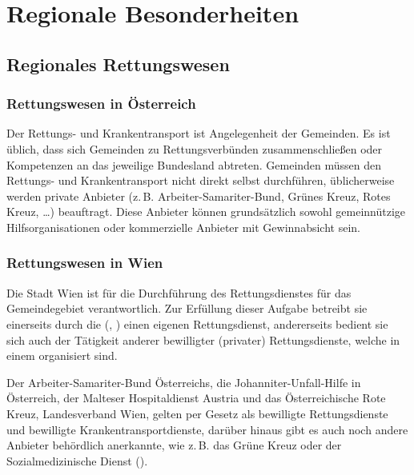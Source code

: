 \def\ChapterCode{REG}
\chapter
[\CO{[REG]} Regionale Besonderheiten]
{Regionale Besonderheiten}
\label{chp:REG}


\section{Regionales Rettungswesen}
\label{topic:regionales-rettungswesen}


\subsection{Rettungswesen in Österreich}

Der Rettungs- und Krankentransport ist Angelegenheit der
Gemeinden. Es ist üblich, dass sich Gemeinden zu
Rettungsverbünden zusammenschließen oder Kompetenzen an das
jeweilige Bundesland abtreten.  Gemeinden müssen den
Rettungs- und Krankentransport nicht direkt selbst
durchführen, üblicherweise werden private Anbieter (z.\,B.
Arbeiter-Samariter-Bund, Grünes Kreuz, Rotes Kreuz, \ldots{})
beauftragt. Diese Anbieter können grundsätzlich sowohl
gemeinnützige Hilfsorganisationen oder kommerzielle Anbieter
mit Gewinnabsicht sein.


\subsection{Rettungswesen in Wien}
\label{topic:rettungswesen-wien}

Die Stadt Wien ist für die Durchführung des Rettungsdienstes
für das Gemeindegebiet verantwortlich. Zur Erfüllung dieser
Aufgabe betreibt sie einerseits durch die
 (, ) einen eigenen Rettungsdienst, andererseits
bedient sie sich auch der Tätigkeit anderer bewilligter
(privater) Rettungsdienste, welche in einem
 organisiert sind.


Der Arbeiter-Samariter-Bund Österreichs, die
Johanniter-Unfall-Hilfe in Österreich, der Malteser
Hospitaldienst Austria und das Österreichische Rote Kreuz,
Landesverband Wien, gelten per Gesetz als bewilligte
Rettungsdienste und bewilligte Krankentransportdienste,
darüber hinaus gibt es auch noch andere Anbieter
behördlich anerkannte, wie z.\,B. das Grüne Kreuz oder der
Sozialmedizinische Dienst ().

